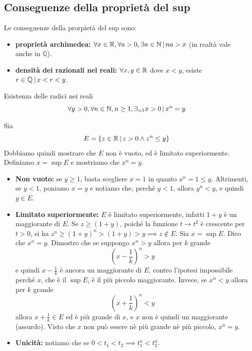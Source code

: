 \documentclass[a4paper]{article}
\begin{document}
\subsection{Conseguenze della proprietà del sup}

Le conseguenze della prorpietà del sup sono:
\begin{itemize}
    \item \textbf{proprietà archimedea:} \(\forall x \in \mathbb{R}, \forall a > 0, \exists n\in\mathbb{N} \,|\, na>x\) (in realtà vale anche in \(\mathbb{Q}\)).
    \item \textbf{densità dei razionali nel reali:} \(\forall x,y \in \mathbb{R}\) dove \(x<y\), esiste \(r\in\mathbb{Q}\,|\, x<r<y\).
\end{itemize}

\begin{snippettheorem}{Esistenza delle radici nei reali}
    \[
        \forall y>0, \forall n \in \mathbb{N}, n \geq 1,
        \exists_{=1} x>0 \,|\, x^n = y
    \]
\end{snippettheorem}

\begin{snippetproof}{}
    Sia \[ E = \{ z \in \mathbb{R} \,|\, z>0 \land z^n \leq y \} \]
    Dobbiamo quindi mostrare che \(E\) non è vuoto, ed è limitato superiormente.
    Definiamo \(x = \sup E\) e mostriamo che \(x^n = y\).
    \begin{itemize}
        \item \textbf{Non vuoto:} se \(y \geq 1\), basta scegliere \(x=1\) in quanto \(x^n=1 \leq y\).
        Altrimenti, se \(y < 1\), poniamo \(x=y\) e notiamo che, perché \(y < 1\), allora
        \(y^n < y\), e quindi \(y \in E\).
        \item \textbf{Limitato superiormente:} \(E\) è limitato superiormente, infatti \(1+y\)
        è un maggiorante di \(E\). Se \(z \geq (1+y)\), poiché la funzione \(t\to t^2\) è crescente per \(t > 0\),
        si ha \(z^n \geq {(1+y)}^n > {(1+y)} > y \implies z \notin E\).
        Sia \(x =\sup E\). Dico che \(x^n = y\). Dimostro che se suppongo \(x^n > y\)
        allora per \(k\) grande
        \[
            {\left(x- \frac{1}{k}\right)}^n > y
        \]
        e quindi \(x-\frac{1}{k}\) è ancora un maggiorante di \(E\), contro l'ipotesi impossibile
        perché \(x\), che è il \(\sup E\), è il più piccolo maggiorante.
        Invece, se \(x^n < y\) allora per \(k\) grande
        \[
            {\left(x + \frac{1}{k}\right)}^n < y
        \]
        allora \(x+\frac{1}{k}\in E\) ed è più grande di \(x\), e \(x\) non è quindi un maggiorante (assurdo).
        Visto che \(x\) non può essere nè più grande nè più piccolo, \(x^n=y\).
        \item \textbf{Unicità:} notiamo che se \(0 < t_1 < t_2 \implies t_1^n < t_2^n\).
    \end{itemize}
\end{snippetproof}
\end{document}
